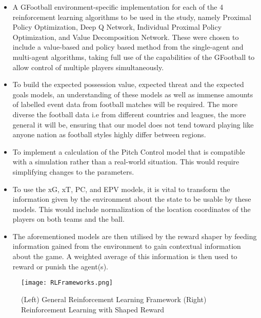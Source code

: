 \documentclass[11pt]{article}
\begin{document}
\begin{itemize}
\item A GFootball environment-specific implementation for each of the 4 reinforcement learning algorithms to be used in the study, namely Proximal Policy Optimization, Deep Q Network, Individual Proximal Policy Optimization, and Value Decomposition Network. These were chosen to include a value-based and policy based method from the single-agent and multi-agent algorithms, taking full use of the capabilities of the GFootball to allow control of multiple players simultaneously.

\item To build the expected possession value, expected threat and the expected goals models, an understanding of these models as well as immense amounts of labelled event data from football matches will be required. The more diverse the football data i.e from different countries and leagues, the more general it will be, ensuring that our model does not tend toward playing like anyone nation as football styles highly differ between regions.

\item To implement a calculation of the Pitch Control model that is compatible with a simulation rather than a real-world situation. This would require simplifying changes to the parameters.

\item To use the xG, xT, PC, and EPV models, it is vital to transform the information given by the environment about the state to be usable by these models. This would include normalization of the location coordinates of the players on both teams and the ball.

\item The aforementioned models are then utilised by the reward shaper by feeding information gained from the environment to gain contextual information about the game. A weighted average of this information is then used to reward or punish the agent(s).
\end{itemize}

\pagebreak

\begin{figure}[t!]
    \centering
    \texttt{[image: RLFrameworks.png]}
    \caption{(Left) General Reinforcement Learning Framework (Right) Reinforcement Learning with Shaped Reward}
    \label{fig:rl-frameworks}
\end{figure}
\end{document}
